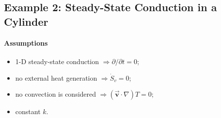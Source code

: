 \documentclass[12pt, a4paper]{article}
\numberwithin{equation}{subsection}
\begin{document}
\subsection{Example 2: Steady-State Conduction in a Cylinder}
\begin{tcolorbox}[breakable, title = \textbf{Example: Conduction Through a Cylinder}]
\begin{minipage}{.6\textwidth}
    \paragraph{Assumptions} 
    \begin{itemize}
        \item 1-D steady-state conduction $\Rightarrow \partial / \partial t = 0$;
        \item no external heat generation $ \Rightarrow \dot{S}_{v} = 0$;
        \item no convection is considered $\Rightarrow (\vec{\bm{v}} \cdot \nabla) T = 0$;
        \item constant $k$.
\end{itemize}


\end{minipage}
\end{tcolorbox}
\end{document}
